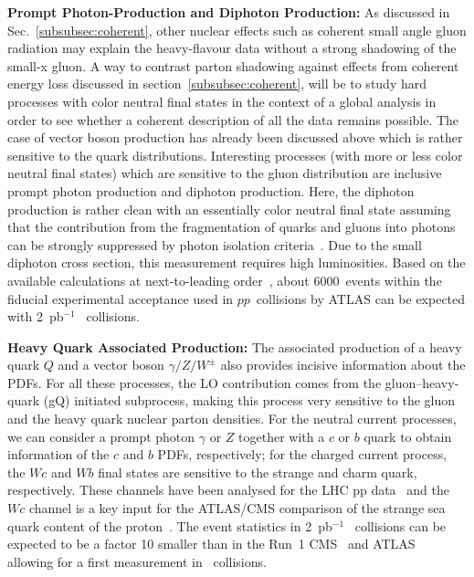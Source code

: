 \documentclass[../report.tex]{subfiles}
\begin{document}
\noindent\textbf{Prompt Photon-Production and Diphoton Production:} 
%
As discussed in Sec.~\ref{subsubsec:coherent}, other nuclear effects such
as coherent small angle gluon radiation may explain the heavy-flavour
data without a strong shadowing of the small-x gluon.  A way to
contrast parton shadowing against effects from coherent energy loss discussed in section~\ref{subsubsec:coherent},
will be to study hard processes with color neutral final states in the
context of a global analysis in order to see whether a coherent
description of all the data remains possible. The case of vector boson
production has already been discussed above which is rather sensitive
to the quark distributions.  Interesting processes (with more or less
color neutral final states) which are sensitive to the gluon
distribution are inclusive prompt photon production and diphoton
production.  Here, the diphoton production is rather clean with an
essentially color neutral final state assuming that the contribution
from the fragmentation of quarks and gluons into photons can be
strongly suppressed by photon isolation criteria~\cite{ATLAS:2017ojy,Acharya:2018dqe}.
Due to the small
diphoton cross section, this measurement requires high luminosities. Based on the available calculations at next-to-leading order~\cite{Catani:2018krb,Boussaha:2018egy}, about 6000~events within the fiducial experimental acceptance used in $pp$~collisions by ATLAS can be expected with 2~pb$^{-1}$ \pPb~collisions.


\noindent\textbf{Heavy Quark Associated Production:}
%
The associated production of a heavy quark $Q$ and a vector boson $\gamma/Z/W^\pm$ 
also provides incisive information  about the PDFs.  
%
For all these processes, the LO contribution   comes from the gluon--heavy-quark (gQ) initiated
subprocess, making this process very sensitive to the gluon and the heavy quark nuclear parton
densities.
%
For the neutral current processes,  we can consider a prompt photon $\gamma$ or $Z$ together with a
$c$ or $b$ quark to obtain information of the $c$ and $b$ PDFs, respectively; 
for the charged current process, the  $Wc$ and $Wb$ final states are sensitive to the strange and charm quark, respectively. 
%
These channels have been analysed for the LHC pp data~\cite{Dunford:2013lya,Beauchemin:2013cra,Ciaccio:2013rka,Candelise:2015gxa,Chatrchyan:2013uja,Aad:2014xca}
and the $Wc$ channel is a key input for the ATLAS/CMS comparison of the strange sea quark content of the proton~\cite{Cooper-Sarkar:2018ufj}.
The event statistics in 2~pb$^{-1}$ \pPb~collisions can be expected to be a factor 10 smaller than in the Run~1 CMS~\cite{Chatrchyan:2013uja} and ATLAS~\cite{Aad:2014xca} allowing for a first measurement in \pPb~collisions. 
\end{document}
